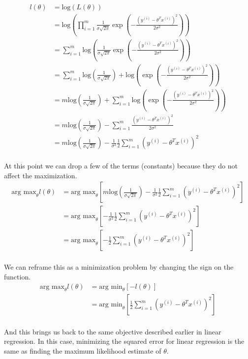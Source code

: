 \documentclass{article}
\begin{document}
\begin{align*}
l(\theta) &= \text{log}(L(\theta))\\
&=\text{log}({\prod_{i=1}^m \frac{1}{\sigma\sqrt{2\pi}} \exp(-\frac{{(y^{(i)}-\theta^Tx^{(i)})}^2}{2\sigma^2})})\\
&=\sum_{i=1}^m \text{log} (\frac{1}{\sigma\sqrt{2\pi}} \exp(-\frac{{(y^{(i)}-\theta^Tx^{(i)})}^2}{2\sigma^2}))\\
&=\sum_{i=1}^m \text{log} (\frac{1}{\sigma\sqrt{2\pi}}) + \text{log} (\exp(-\frac{{(y^{(i)}-\theta^Tx^{(i)})}^2}{2\sigma^2}))\\
&= m\text{log} (\frac{1}{\sigma\sqrt{2\pi}}) + \sum_{i=1}^m\text{log} (\exp(-\frac{{(y^{(i)}-\theta^Tx^{(i)})}^2}{2\sigma^2}))\\
&= m\text{log} (\frac{1}{\sigma\sqrt{2\pi}}) -\sum_{i=1}^m\frac{{(y^{(i)}-\theta^Tx^{(i)})}^2}{2\sigma^2}\\
&= m\text{log} (\frac{1}{\sigma\sqrt{2\pi}}) -\frac{1}{\sigma^2}\frac{1}{2}\sum_{i=1}^m{(y^{(i)}-\theta^Tx^{(i)})}^2\\
\end{align*} 

At this point we can drop a few of the terms (constants) because they do not affect the maximization.
\begin{align*}
\text{arg max}_\theta l(\theta) &= \text{arg max}_\theta [m\text{log} (\frac{1}{\sigma\sqrt{2\pi}}) -\frac{1}{\sigma^2}\frac{1}{2}\sum_{i=1}^m{(y^{(i)}-\theta^Tx^{(i)})}^2]\\
&= \text{arg max}_\theta [-\frac{1}{\sigma^2}\frac{1}{2}\sum_{i=1}^m{(y^{(i)}-\theta^Tx^{(i)})}^2]\\
&= \text{arg max}_\theta [-\frac{1}{2}\sum_{i=1}^m{(y^{(i)}-\theta^Tx^{(i)})}^2]\\
\end{align*}

We can reframe this as a minimization problem by changing the sign on the function.
\begin{align*}
\text{arg max}_\theta l(\theta) &= \text{arg min}_\theta [- l(\theta)]\\
&= \text{arg min}_\theta [\frac{1}{2}\sum_{i=1}^m{(y^{(i)}-\theta^Tx^{(i)})}^2]\\
\end{align*}

And this brings us back to the same objective described earlier in linear regression. In this case, minimizing the squared error for linear regression is the same as finding the maximum likelihood estimate of $\theta$.
\end{document}

